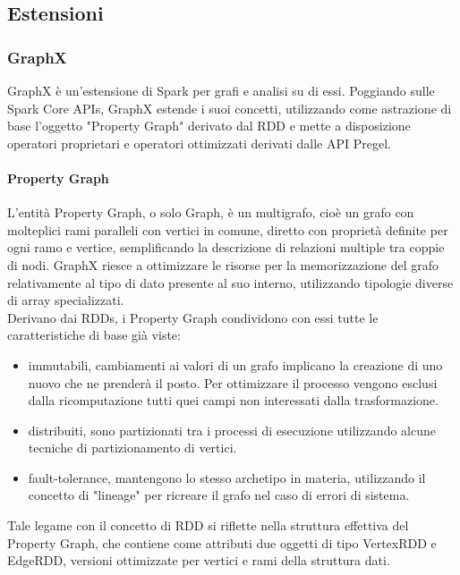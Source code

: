 \subsection{Estensioni}
\subsubsection{GraphX}

GraphX è un'estensione di Spark per grafi e analisi su di essi. Poggiando sulle Spark Core APIs, GraphX estende i suoi concetti, utilizzando come astrazione di base l'oggetto "Property Graph" derivato dal RDD e mette a disposizione operatori proprietari e operatori ottimizzati derivati dalle API Pregel.
\paragraph{Property Graph}
L'entità Property Graph, o solo Graph, è un multigrafo, cioè un grafo con molteplici rami paralleli con vertici in comune, diretto con proprietà definite per ogni ramo e vertice, semplificando la descrizione di relazioni multiple tra coppie di nodi. GraphX riesce a ottimizzare le risorse per la memorizzazione del grafo relativamente al tipo di dato presente al suo interno, utilizzando tipologie diverse di array specializzati.\\
Derivano dai RDDs, i Property Graph condividono con essi tutte le caratteristiche di base già viste: 
\begin{itemize}
	\item immutabili, cambiamenti ai valori di un grafo implicano la creazione di uno nuovo che ne prenderà il posto. Per ottimizzare il processo vengono esclusi dalla ricomputazione tutti quei campi non interessati dalla trasformazione.
	\item distribuiti, sono partizionati tra i processi di esecuzione utilizzando alcune tecniche di partizionamento di vertici.
	\item fault-tolerance, mantengono lo stesso archetipo in materia, utilizzando il concetto di "lineage" per ricreare il grafo nel caso di errori di sistema.
\end{itemize}
Tale legame con il concetto di RDD si riflette nella struttura effettiva del Property Graph, che contiene come attributi due oggetti di tipo VertexRDD e EdgeRDD, versioni ottimizzate per vertici e rami della struttura dati.

